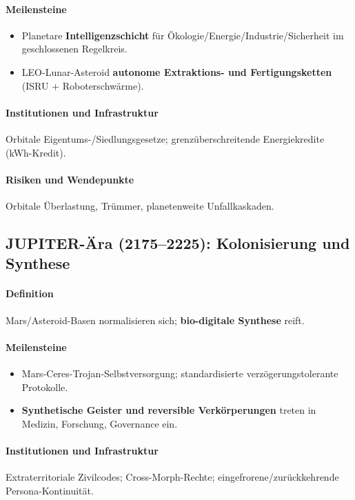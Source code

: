 \documentclass[11pt]{article}
\begin{document}
\paragraph{Meilensteine}
\begin{itemize}[noitemsep]
  \item Planetare \textbf{Intelligenzschicht} für Ökologie/Energie/Industrie/Sicherheit im geschlossenen Regelkreis.
  \item LEO-Lunar-Asteroid \textbf{autonome Extraktions- und Fertigungsketten} (ISRU + Roboterschwärme).
\end{itemize}

\paragraph{Institutionen und Infrastruktur} Orbitale Eigentums-/Siedlungsgesetze; grenzüberschreitende Energiekredite (kWh-Kredit).

\paragraph{Risiken und Wendepunkte} Orbitale Überlastung, Trümmer, planetenweite Unfallkaskaden.

\subsection{JUPITER-Ära (2175–2225): Kolonisierung und Synthese}
\paragraph{Definition} Mars/Asteroid-Basen normalisieren sich; \textbf{bio-digitale Synthese} reift.

\paragraph{Meilensteine}
\begin{itemize}[noitemsep]
  \item Mars-Ceres-Trojan-Selbstversorgung; standardisierte verzögerungstolerante Protokolle.
  \item \textbf{Synthetische Geister und reversible Verkörperungen} treten in Medizin, Forschung, Governance ein.
\end{itemize}

\paragraph{Institutionen und Infrastruktur} Extraterritoriale Zivilcodes; Cross-Morph-Rechte; eingefrorene/zurückkehrende Persona-Kontinuität.
\end{document}
